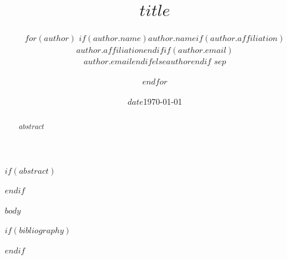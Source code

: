 \documentclass[11pt]{article}
\title{$title$}
\author{%
$for(author)$
  $if(author.name)$$author.name$$if(author.affiliation)$\\$author.affiliation$$endif$$if(author.email)$\\$author.email$$endif$$else$$author$$endif$%
  $sep$ \and
$endfor$
}
\author{}
\date{$date$}
\date{\today}
\begin{document}
\maketitle

$if(abstract)$
\begin{abstract}
$abstract$
\end{abstract}
$endif$

$body$


$if(bibliography)$

$endif$
\end{document}
